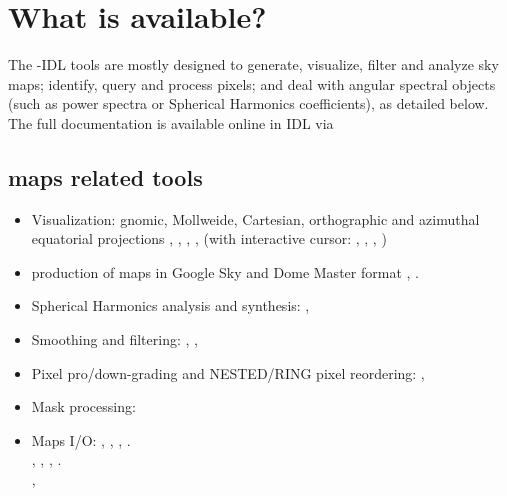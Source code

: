 \section{What is available?}



The \healpixns-IDL tools are mostly designed to 
generate, visualize, filter and analyze sky maps;
identify, query and process \healpix pixels; 
and deal with angular spectral objects (such as power spectra or Spherical
Harmonics coefficients), 
as detailed below.
The full documentation is available online in IDL via 
\subsection[Maps related tools]{\healpix maps related tools}
\begin{itemize} 
%
\item Visualization: gnomic, Mollweide, Cartesian,
orthographic and azimuthal equatorial projections
, 
, 
, 
, 
(with interactive cursor:
,
,
,
)
%
\item production of \healpix maps in Google Sky and Dome Master format
,
.
% 
\item Spherical Harmonics analysis and synthesis:
,
%
\item Smoothing and filtering:
,
,
%
\item Pixel pro/down-grading and NESTED/RING pixel reordering:
,
%
\item Mask processing:
%
\item Maps I/O:
,
,
,
.\\
,
, 
,
. \\
,
\end{itemize}
